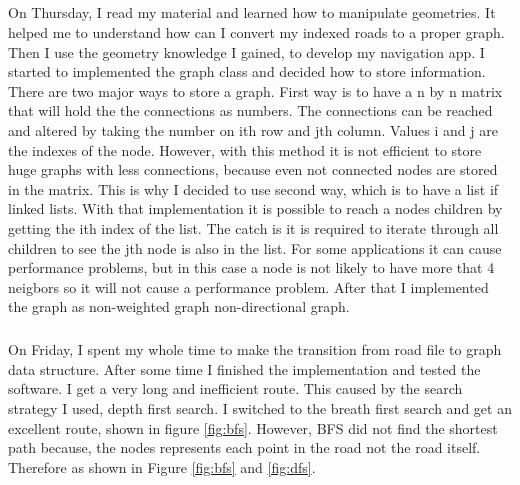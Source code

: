 \documentclass{article}
\begin{document}
\subparagraph{}
On Thursday, I read my material and learned how to manipulate geometries. It helped me to understand how can I convert my indexed roads to a proper graph. Then I use the geometry knowledge I gained, to develop my navigation app. I started to implemented the graph class and decided how to store information. There are two major ways to store a graph. First way is to have a n by n matrix that will hold the the connections as numbers. The connections can be reached and altered by taking the number on ith row and jth column. Values i and j are the indexes of the node. However, with this method it is not efficient to store huge graphs with less connections, because even not connected nodes are stored in the matrix. This is why I decided to use second way, which is to have a list if linked lists. With that implementation it is possible to reach a nodes children by getting the ith index of the list. The catch is it is required to iterate through all children to see the jth node is also in the list. For some applications it  can cause performance problems, but  in this case a node is not likely to have more that 4 neigbors so it will not cause a performance problem. After that I implemented the graph as non-weighted graph non-directional graph.

\subparagraph{}
On Friday, I spent my whole time to make the transition from road file to graph data structure. After some time I finished the implementation and tested the software. I get a very long and inefficient route. This caused by the search strategy I used, depth first search. I switched to the breath first search and get an excellent route, shown in figure \ref{fig:bfs}. However, BFS did not find the shortest path because, the nodes represents each point in the road not the road itself. Therefore as shown in Figure \ref{fig:bfs} and \ref{fig:dfs}.
\end{document}
